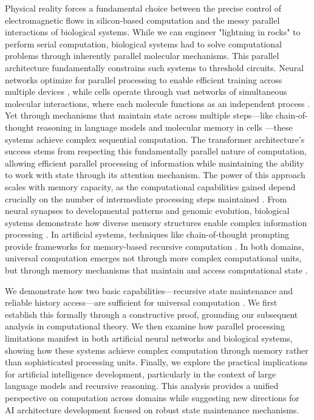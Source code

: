\documentclass[12pt]{article}
\begin{document}
Physical reality forces a fundamental choice between the precise control of electromagnetic flows in silicon-based computation and the messy parallel interactions of biological systems.
While we can engineer "lightning in rocks" to perform serial computation, biological systems had to solve computational problems through inherently parallel molecular mechanisms.
This parallel architecture fundamentally constrains such systems to threshold circuits.
Neural networks optimize for parallel processing to enable efficient training across multiple devices \cite{merrill2023parallelism,merrill2024}, while cells operate through vast networks of simultaneous molecular interactions, where each molecule functions as an independent process \cite{fu2023scgrn}.
Yet through mechanisms that maintain state across multiple steps---like chain-of-thought reasoning in language models \cite{wei2022chain,qiu2024ask} and molecular memory in cells \cite{hoel2020emergence}---these systems achieve complex sequential computation.
The transformer architecture's success stems from respecting this fundamentally parallel nature of computation, allowing efficient parallel processing of information while maintaining the ability to work with state through its attention mechanism.
The power of this approach scales with memory capacity, as the computational capabilities gained depend crucially on the number of intermediate processing steps maintained \cite{merrill2024}.
From neural synapses to developmental patterns and genomic evolution, biological systems demonstrate how diverse memory structures enable complex information processing \cite{burrill2010making,espinosa2024molecular}.
In artificial systems, techniques like chain-of-thought prompting provide frameworks for memory-based recursive computation \cite{wei2022chain,dickson2024trust,ahn2024recursive}.
In both domains, universal computation emerges not through more complex computational units, but through memory mechanisms that maintain and access computational state \cite{schuurmans2024autoregressive}.

We demonstrate how two basic capabilities---recursive state maintenance and reliable history access---are sufficient for universal computation \cite{bennett1989time,boyle2024memory}.
We first establish this formally through a constructive proof, grounding our subsequent analysis in computational theory.
We then examine how parallel processing limitations manifest in both artificial neural networks and biological systems, showing how these systems achieve complex computation through memory rather than sophisticated processing units.
Finally, we explore the practical implications for artificial intelligence development, particularly in the context of large language models and recursive reasoning.
This analysis provides a unified perspective on computation across domains while suggesting new directions for AI architecture development focused on robust state maintenance mechanisms.
\end{document}
